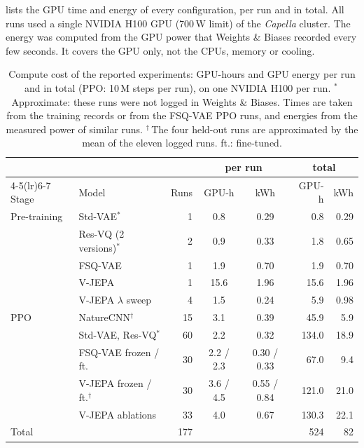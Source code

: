 \documentclass[runningheads,a4paper]{llncs}
\begin{document}
 lists the GPU time and energy of every configuration, per run and in total. All
runs used a single NVIDIA H100 GPU (700\,W limit) of the \emph{Capella} cluster. The energy was
computed from the GPU power that Weights \& Biases recorded every few seconds. It covers the GPU
only, not the CPUs, memory or cooling.

\begin{table}[!t]
\centering
\caption{Compute cost of the reported experiments: GPU-hours and GPU energy per run and in
total (PPO: 10\,M steps per run), on one NVIDIA H100 per run. $^{*}$\,Approximate: these runs were not logged in Weights \&
Biases. Times are taken from the training records or from the FSQ-VAE PPO runs, and energies
from the measured power of similar runs. $^{\dagger}$\,The four held-out runs are approximated
by the mean of the eleven logged runs. ft.: fine-tuned.}
\label{tab:cost}
\footnotesize\setlength{\tabcolsep}{3.5pt}
\begin{tabular}{@{}llrccrr@{}}
\toprule
 & & & \multicolumn{2}{c}{per run} & \multicolumn{2}{c}{total} \\
\cmidrule(lr){4-5}\cmidrule(lr){6-7}
Stage & Model & Runs & GPU-h & kWh & GPU-h & kWh \\
\midrule
Pre-training & Std-VAE$^{*}$ & 1 & 0.8 & 0.29 & 0.8 & 0.29 \\
 & Res-VQ (2 versions)$^{*}$ & 2 & 0.9 & 0.33 & 1.8 & 0.65 \\
 & FSQ-VAE & 1 & 1.9 & 0.70 & 1.9 & 0.70 \\
 & V-JEPA & 1 & 15.6 & 1.96 & 15.6 & 1.96 \\
 & V-JEPA $\lambda$ sweep & 4 & 1.5 & 0.24 & 5.9 & 0.98 \\
\midrule
PPO & NatureCNN$^{\dagger}$ & 15 & 3.1 & 0.39 & 45.9 & 5.9 \\
 & Std-VAE, Res-VQ$^{*}$ & 60 & 2.2 & 0.32 & 134.0 & 18.9 \\
 & FSQ-VAE frozen / ft. & 30 & 2.2 / 2.3 & 0.30 / 0.33 & 67.0 & 9.4 \\
 & V-JEPA frozen / ft.$^{\dagger}$ & 30 & 3.6 / 4.5 & 0.55 / 0.84 & 121.0 & 21.0 \\
 & V-JEPA ablations & 33 & 4.0 & 0.67 & 130.3 & 22.1 \\
\midrule
Total & & 177 & & & 524 & 82 \\
\bottomrule
\end{tabular}
\end{table}
\end{document}

